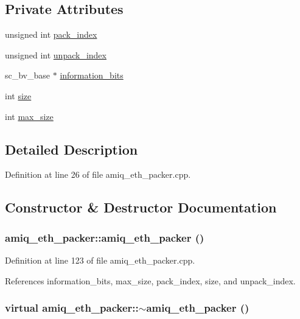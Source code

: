\subsection*{Private Attributes}
\begin{DoxyCompactItemize}
\item 
unsigned int \hyperlink{classamiq__eth__packer_a02e2192acef20608462656554e21646b}{pack\_\-index}
\item 
unsigned int \hyperlink{classamiq__eth__packer_a04bf30a6893a4079fc1093af6dc999b9}{unpack\_\-index}
\item 
sc\_\-bv\_\-base $\ast$ \hyperlink{classamiq__eth__packer_a5b4237c5e55bc859644dcad30b252738}{information\_\-bits}
\item 
int \hyperlink{classamiq__eth__packer_a07f2906c680407d101afb9ac2c5d42f6}{size}
\item 
int \hyperlink{classamiq__eth__packer_a3fc5556f660d26c71d69f732c9ddb80f}{max\_\-size}
\end{DoxyCompactItemize}


\subsection{Detailed Description}


Definition at line 26 of file amiq\_\-eth\_\-packer.cpp.

\subsection{Constructor \& Destructor Documentation}
\hypertarget{classamiq__eth__packer_ad503914eb2cb923d5ba7b767f88f0b7f}{
\subsubsection[{amiq\_\-eth\_\-packer}]{\setlength{\rightskip}{0pt plus 5cm}amiq\_\-eth\_\-packer::amiq\_\-eth\_\-packer ()}}
\label{classamiq__eth__packer_ad503914eb2cb923d5ba7b767f88f0b7f}


Definition at line 123 of file amiq\_\-eth\_\-packer.cpp.

References information\_\-bits, max\_\-size, pack\_\-index, size, and unpack\_\-index.\hypertarget{classamiq__eth__packer_a87fda1fe83328486346166ee2fea0382}{
\subsubsection[{$\sim$amiq\_\-eth\_\-packer}]{\setlength{\rightskip}{0pt plus 5cm}virtual amiq\_\-eth\_\-packer::$\sim$amiq\_\-eth\_\-packer ()}}
\label{classamiq__eth__packer_a87fda1fe83328486346166ee2fea0382}


